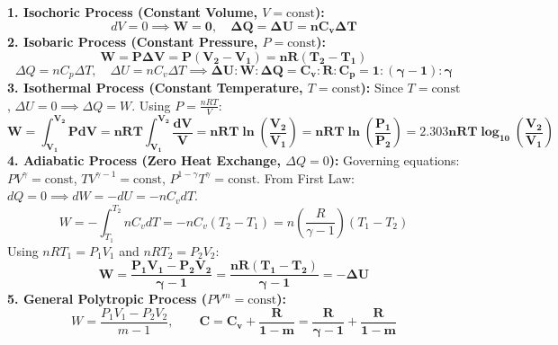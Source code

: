 \documentclass[10pt,a4paper]{article}
\begin{document}
\begin{formulabox}
\textbf{1. Isochoric Process (Constant Volume, $V = \text{const}$):}
\begin{equation}
  dV = 0 \implies \mathbf{W = 0}, \quad \mathbf{\Delta Q = \Delta U = n C_v \Delta T}
\end{equation}
\textbf{2. Isobaric Process (Constant Pressure, $P = \text{const}$):}
\begin{equation}
  \mathbf{W = P \Delta V = P(V_2 - V_1) = n R (T_2 - T_1)}
\end{equation}
\begin{equation}
  \Delta Q = n C_p \Delta T, \quad \Delta U = n C_v \Delta T \implies \mathbf{\Delta U : W : \Delta Q = C_v : R : C_p = 1 : (\gamma - 1) : \gamma}
\end{equation}
\textbf{3. Isothermal Process (Constant Temperature, $T = \text{const}$):}
Since $T = \text{const}$, $\Delta U = 0 \implies \Delta Q = W$. Using $P = \frac{nRT}{V}$:
\begin{equation}
  \mathbf{W = \int_{V_1}^{V_2} P dV = n R T \int_{V_1}^{V_2} \frac{dV}{V} = n R T \ln\left(\frac{V_2}{V_1}\right) = n R T \ln\left(\frac{P_1}{P_2}\right) = 2.303 n R T \log_{10}\left(\frac{V_2}{V_1}\right)}
\end{equation}
\textbf{4. Adiabatic Process (Zero Heat Exchange, $\Delta Q = 0$):}
Governing equations: $P V^\gamma = \text{const}$, $T V^{\gamma-1} = \text{const}$, $P^{1-\gamma} T^\gamma = \text{const}$.
From First Law: $dQ = 0 \implies dW = -dU = -n C_v dT$.
\begin{equation}
  W = -\int_{T_1}^{T_2} n C_v dT = -n C_v (T_2 - T_1) = n \left(\frac{R}{\gamma - 1}\right)(T_1 - T_2)
\end{equation}
Using $nRT_1 = P_1 V_1$ and $nRT_2 = P_2 V_2$:
\begin{equation}
  \mathbf{W = \frac{P_1 V_1 - P_2 V_2}{\gamma - 1} = \frac{n R (T_1 - T_2)}{\gamma - 1} = -\Delta U}
\end{equation}
\textbf{5. General Polytropic Process ($P V^m = \text{const}$):}
\begin{equation}
  W = \frac{P_1 V_1 - P_2 V_2}{m - 1}, \qquad \mathbf{C = C_v + \frac{R}{1 - m} = \frac{R}{\gamma - 1} + \frac{R}{1 - m}}
\end{equation}
\end{formulabox}
\end{document}
